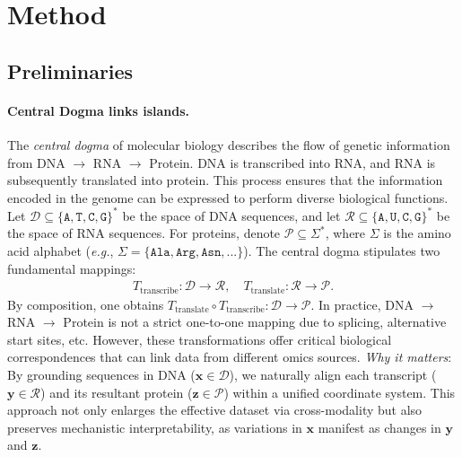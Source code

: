 \section{Method}
\subsection{Preliminaries}

\paragraph{Central Dogma links islands.}
The \textit{central dogma} of molecular biology describes the flow of genetic information from DNA $\rightarrow$ RNA $\rightarrow$ Protein. DNA is transcribed into RNA, and RNA is subsequently translated into protein. This process ensures that the information encoded in the genome can be expressed to perform diverse biological functions. Let \( \mathcal{D} \subseteq \{\texttt{A}, \texttt{T}, \texttt{C}, \texttt{G}\}^*\) be the space of DNA sequences, and let \(\mathcal{R} \subseteq \{\texttt{A}, \texttt{U}, \texttt{C}, \texttt{G}\}^*\) be the space of RNA sequences. For proteins, denote \(\mathcal{P} \subseteq \Sigma^*\), where \(\Sigma\) is the amino acid alphabet (\textit{e.g.}, \(\Sigma = \{ \texttt{Ala}, \texttt{Arg}, \texttt{Asn}, ...\}\)). The central dogma stipulates two fundamental mappings:
\begin{align}
    T_{\mathrm{transcribe}}: \mathcal{D} \to \mathcal{R}, \quad
    T_{\mathrm{translate}}: \mathcal{R} \to \mathcal{P}.
\end{align}
By composition, one obtains \(T_{\mathrm{translate}} \circ T_{\mathrm{transcribe}}: \mathcal{D} \to \mathcal{P}\). In practice, DNA $\rightarrow$ RNA $\rightarrow$ Protein is not a strict one-to-one mapping due to splicing, alternative start sites, etc. However, these transformations offer critical biological correspondences that can link data from different omics sources.
\textit{Why it matters}: By grounding sequences in DNA (\( \mathbf{x} \in \mathcal{D} \)), we naturally align each transcript (\( \mathbf{y} \in \mathcal{R} \)) and its resultant protein (\( \mathbf{z} \in \mathcal{P} \)) within a unified coordinate system. This approach not only enlarges the effective dataset via cross-modality but also preserves mechanistic interpretability, as variations in \(\mathbf{x}\) manifest as changes in \(\mathbf{y}\) and \(\mathbf{z}\).

